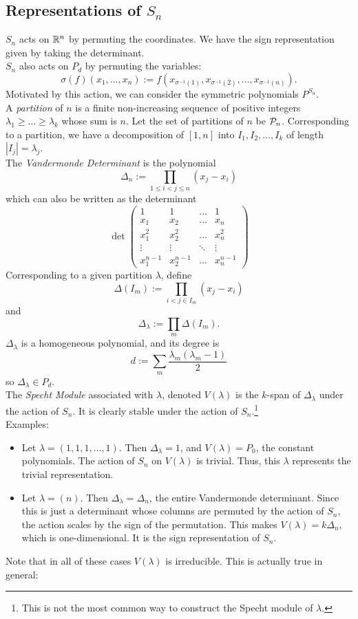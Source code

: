 \documentclass{amsart}
\begin{document}
\subsection{Representations of $S_n$} $S_n$ acts on $\mathbb{R}^n$ by permuting the coordinates. We have the sign representation given by taking the determinant.\\

$S_n$ also acts on $P_d$ by permuting the variables:
$$
\sigma(f)(x_1,\dots,x_n) := f(x_{\sigma^{-1}(1)},x_{\sigma^{-1}(2)},\dots,x_{\sigma^{-1}(n)}).
$$
Motivated by this action, we can consider the symmetric polynomials $P^{S_n}$.\\

A \textit{partition} of $n$ is a finite non-increasing sequence of positive integers $\lambda_1\geq \dots \geq \lambda_k$ whose sum is $n$. Let the set of partitions of $n$ be $\mathcal{P}_n$. Corresponding to a partition, we have a decomposition of $[1,n]$ into $I_1,I_2,\dots,I_k$ of length $|I_j|=\lambda_j$.\\

The \textit{Vandermonde Determinant} is the polynomial
$$
\Delta_n := \prod_{1\leq i < j \leq n} (x_j-x_i)
$$
which can also be written as the determinant 
$$
\det \begin{pmatrix}
	1 & 1 & \dots & 1\\
	x_1 & x_2 & \dots & x_n \\
	x_1^2 & x_2^2 & \dots & x_n^2\\
	\vdots & \vdots & \ddots & \vdots \\
	x_1^{n-1} & x_2^{n-1} & \dots & x_n^{n-1}
\end{pmatrix}
$$
Corresponding to a given partition $\lambda$, define
$$
\Delta(I_m) := \prod_{i<j \in I_m} (x_j-x_i)
$$
and 
$$
\Delta_{\lambda} := \prod_m \Delta(I_m).
$$
$\Delta_{\lambda}$ is a homogeneous polynomial, and its degree is 
$$
d := \sum_{m} \frac{\lambda_m(\lambda_m-1)}{2}
$$
so $\Delta_{\lambda}\in P_d$.\\ 

The \textit{Specht Module} associated with $\lambda$, denoted $V(\lambda)$ is the $k$-span of $\Delta_{\lambda}$ under the action of $S_n$. It is clearly stable under the action of $S_n$.\footnote{This is not the most common way to construct the Specht module of $\lambda$.}\\

Examples:
\begin{itemize}
	\item Let $\lambda = (1,1,1,\dots,1)$. Then $\Delta_{\lambda} = 1$,  and $V(\lambda) = P_0$, the constant polynomials. The action of $S_n$ on $V(\lambda)$ is trivial. Thus, this $\lambda$ represents the trivial representation.
	\item Let $\lambda = (n)$. Then $\Delta_{\lambda} = \Delta_n$, the entire Vandermonde determinant. Since this is just a determinant whose columns are permuted by the action of $S_n$, the action scales by the sign of the permutation. This makes $V(\lambda) = k\Delta_n$, which is one-dimensional. It is the sign representation of $S_n$.
\end{itemize}
Note that in all of these cases $V(\lambda)$ is irreducible. This is actually true in general:\\
\end{document}
